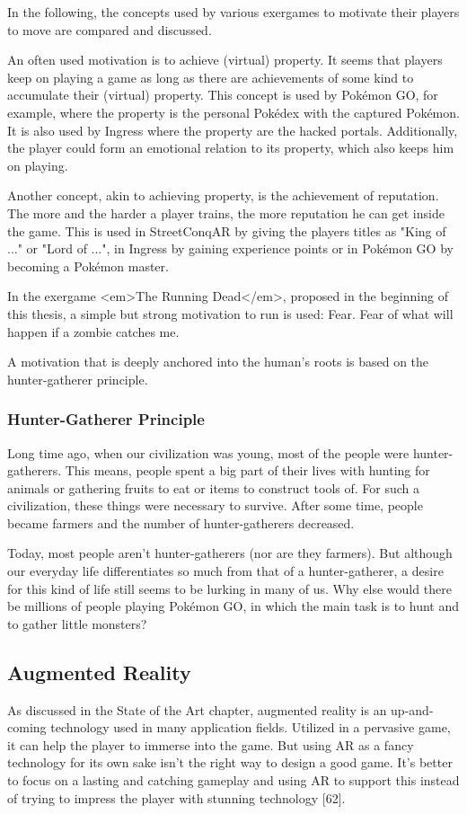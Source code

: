 In the following, the concepts used by various exergames to motivate their players to move are compared and discussed.

An often used motivation is to achieve (virtual) property. It seems that players keep on playing a game as long as there are achievements of some kind to accumulate their (virtual) property. This concept is used by Pokémon GO, for example, where the property is the personal Pokédex with the captured Pokémon. It is also used by Ingress where the property are the hacked portals. Additionally, the player could form an emotional relation to its property, which also keeps him on playing.

Another concept, akin to achieving property, is the achievement of reputation. The more and the harder a player trains, the more reputation he can get inside the game. This is used in StreetConqAR by giving the players titles as "King of ..." or "Lord of ...", in Ingress by gaining experience points or in Pokémon GO by becoming a Pokémon master.

In the exergame <em>The Running Dead</em>, proposed in the beginning of this thesis, a simple but strong motivation to run is used: Fear. Fear of what will happen if a zombie catches me.

A motivation that is deeply anchored into the human’s roots is based on the hunter-gatherer principle.

\subsubsection{Hunter-Gatherer Principle}
Long time ago, when our civilization was young, most of the people were hunter-gatherers. This means, people spent a big part of their lives with hunting for animals or gathering fruits to eat or items to construct tools of. For such a civilization, these things were necessary to survive. After some time, people became farmers and the number of hunter-gatherers decreased.

Today, most people aren’t hunter-gatherers (nor are they farmers). But although our everyday life differentiates so much from that of a hunter-gatherer, a desire for this kind of life still seems to be lurking in many of us. Why else would there be millions of people playing Pokémon GO, in which the main task is to hunt and to gather little monsters?

\subsection{Augmented Reality}
As discussed in the State of the Art chapter, augmented reality is an up-and-coming technology used in many application fields. Utilized in a pervasive game, it can help the player to immerse into the game. But using AR as a fancy technology for its own sake isn’t the right way to design a good game. It’s better to focus on a lasting and catching gameplay and using AR to support this instead of trying to impress the player with stunning technology [62].

